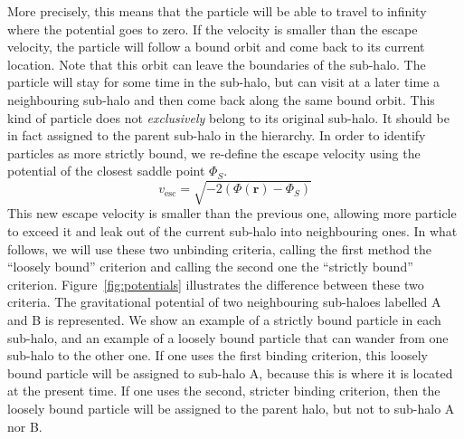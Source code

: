 More precisely, this means that the particle will be able to travel to
infinity where the potential goes to  zero. If the velocity is smaller
than the escape  velocity, the particle will follow a  bound orbit and
come back to its current location.  Note that this orbit can leave the
boundaries of the  sub-halo.  The particle will stay for  some time in
the sub-halo,  but can visit at  a later time a  neighbouring sub-halo
and then come back along the  same bound orbit.  This kind of particle
does not \emph{exclusively} belong  to its original sub-halo. It should
be in fact assigned to the parent sub-halo in the hierarchy.  In order
to identify particles as more  strictly bound, we re-define the escape
velocity using the potential of the closest saddle point $\Phi_S$.
\begin{equation}
v_{\mathrm{esc}} = \sqrt{- 2(\Phi(\mathbf{r})-\Phi_S)}
\label{eq:boundv_corr}
\end{equation}
This new  escape velocity is  smaller than the previous  one, allowing
more particle to  exceed it and leak out of  the current sub-halo into
neighbouring ones.  In what  follows, we will  use these two unbinding
criteria, calling the first method the ``loosely bound'' criterion and
calling   the   second   one   the   ``strictly   bound''   criterion.
Figure~\ref{fig:potentials} illustrates  the difference  between these
two  criteria.   The  gravitational  potential  of   two  neighbouring
sub-haloes labelled A  and B is represented.  We show  an example of a
strictly bound particle in each sub-halo,  and an example of a loosely
bound particle that can wander from one sub-halo to the other one.  If
one uses the first binding criterion, this loosely bound particle
will be  assigned to sub-halo A,  because this is where  it is located at
the present time.  If one uses the second, stricter binding criterion,
then the loosely bound particle will be assigned to the parent halo, but
not to sub-halo A nor B.






